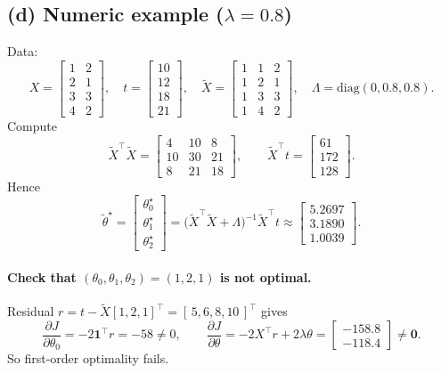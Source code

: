 \documentclass[11pt]{article}
\begin{document}
\subsection*{(d) Numeric example ($\lambda=0.8$)}
Data:
\[
X=\begin{bmatrix}
1&2\\2&1\\3&3\\4&2
\end{bmatrix},\quad
t=\begin{bmatrix}10\\12\\18\\21\end{bmatrix},\quad
\tilde X=\begin{bmatrix}
1&1&2\\1&2&1\\1&3&3\\1&4&2
\end{bmatrix},\quad
\Lambda=\mathrm{diag}(0,0.8,0.8).
\]
Compute
\[
\tilde X^\top\tilde X=\begin{bmatrix}4&10&8\\10&30&21\\8&21&18\end{bmatrix},\qquad
\tilde X^\top t=\begin{bmatrix}61\\172\\128\end{bmatrix}.
\]
Hence
\[
\tilde\theta^\star=
\begin{bmatrix}\theta_0^\star\\\theta_1^\star\\\theta_2^\star\end{bmatrix}
=
\bigl(\tilde X^\top\tilde X+\Lambda\bigr)^{-1}\tilde X^\top t
\approx
\begin{bmatrix}
5.2697\\[2pt]
3.1890\\[2pt]
1.0039
\end{bmatrix}.
\]

\paragraph{Check that $(\theta_0,\theta_1,\theta_2)=(1,2,1)$ is not optimal.}
Residual $r=t-\tilde X[1,2,1]^\top=[\,5,6,8,10\,]^\top$ gives
\[
\frac{\partial J}{\partial \theta_0}=-2\mathbf 1^\top r=-58\neq 0,\qquad
\frac{\partial J}{\partial \theta}=-2X^\top r+2\lambda\theta=\begin{bmatrix}-158.8\\-118.4\end{bmatrix}\neq\bm 0.
\]
So first-order optimality fails.
\end{document}
